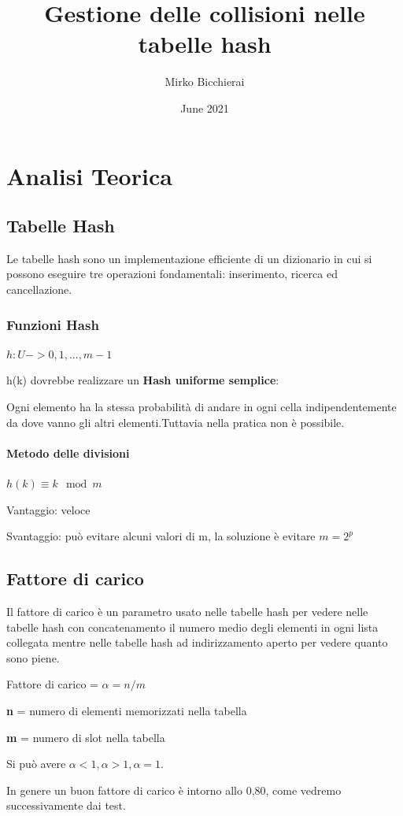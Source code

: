 \documentclass{article}
\title{Gestione delle collisioni nelle tabelle hash}
\author{Mirko Bicchierai}
\date{June 2021}
\begin{document}
\maketitle

\section{Analisi Teorica}
\subsection{Tabelle Hash}
Le tabelle hash sono un implementazione efficiente di un dizionario in cui si possono eseguire tre operazioni fondamentali: inserimento, ricerca ed cancellazione.
\subsubsection{Funzioni Hash}
    $h:U->{0,1,...,m-1}$
    
    h(k) dovrebbe realizzare un \textbf{Hash uniforme semplice}:
    
    Ogni elemento ha la stessa probabilità di andare in ogni cella indipendentemente da dove vanno gli altri elementi.Tuttavia nella pratica non è possibile.
\paragraph{Metodo delle divisioni}
 $h(k)\equiv k \mod m$
 
 Vantaggio: veloce
 
 Svantaggio: può evitare alcuni valori di m, la soluzione è evitare $m=2^p$
\subsection{Fattore di carico}
Il fattore di carico è un parametro usato nelle tabelle hash per vedere nelle tabelle hash con concatenamento il numero medio degli elementi in ogni lista collegata mentre nelle tabelle hash ad indirizzamento aperto per vedere quanto sono piene.

Fattore di carico = $ \alpha = n/m$

\textbf{n} = numero di elementi memorizzati nella tabella 

\textbf{m} = numero di slot nella tabella

Si può avere $ \alpha <1 , \alpha >1 , \alpha = 1$. 

In genere un buon fattore di carico è intorno allo 0,80, come vedremo successivamente dai test.
\end{document}
